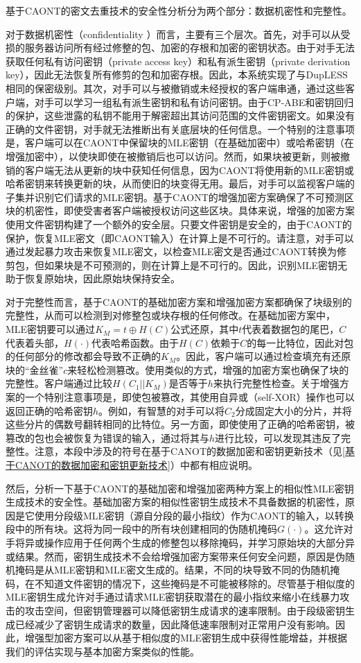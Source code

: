 \documentclass[promaster]{thesis-uestc}
\begin{document}
基于CAONT的密文去重技术的安全性分析分为两个部分：数据机密性和完整性。

对于数据机密性（confidentiality ）而言，主要有三个层次。首先，对手可以从受损的服务器访问所有经过修整的包、加密的存根和加密的密钥状态。由于对手无法获取任何私有访问密钥（private access key）和私有派生密钥（private derivation key），因此无法恢复所有修剪的包和加密存根。因此，本系统实现了与DupLESS相同的保密级别。其次，对手可以与被撤销或未经授权的客户端串通，通过这些客户端，对手可以学习一组私有派生密钥和私有访问密钥。由于CP-ABE和密钥回归的保护，这些泄露的私钥不能用于解密超出其访问范围的文件密钥密文。如果没有正确的文件密钥，对手就无法推断出有关底层块的任何信息。一个特别的注意事项是，客户端可以在CAONT中保留块的MLE密钥（在基础加密中）或哈希密钥（在增强加密中），以使块即使在被撤销后也可以访问。然而，如果块被更新，则被撤销的客户端无法从更新的块中获知任何信息，因为CAONT将使用新的MLE密钥或哈希密钥来转换更新的块，从而使旧的块变得无用。最后，对手可以监视客户端的子集并识别它们请求的MLE密钥。基于CAONT的增强加密方案确保了不可预测区块的机密性，即使受害者客户端被授权访问这些区块。具体来说，增强的加密方案使用文件密钥构建了一个额外的安全层。只要文件密钥是安全的，由于CAONT的保护，恢复MLE密文（即CAONT输入）在计算上是不可行的。请注意，对手可以通过发起暴力攻击来恢复MLE密文，以检查MLE密文是否通过CAONT转换为修剪包，但如果块是不可预测的，则在计算上是不可行的。因此，识别MLE密钥无助于恢复原始块，因此原始块保持安全。

对于完整性而言，基于CAONT的基础加密方案和增强加密方案都确保了块级别的完整性，从而可以检测到对修整包或块存根的任何修改。在基础加密方案中，MLE密钥要可以通过$K_M = t \oplus H(C)$公式还原，其中$t$代表着数据包的尾巴，$C$代表着头部，$H(\cdot)$代表哈希函数。由于$H(C)$依赖于$C$的每一比特位，因此对包的任何部分的修改都会导致不正确的$K_M$。因此，客户端可以通过检查填充有还原块的“金丝雀”$c$来轻松检测篡改。使用类似的方式，增强的加密方案也确保了块的完整性。客户端通过比较$H(C_1||K_M)$是否等于$h$来执行完整性检查。关于增强方案的一个特别注意事项是，即使包被篡改，其使用自异或（self-XOR）操作也可以返回正确的哈希密钥$h$。例如，有智慧的对手可以将$C_2$分成固定大小的分片，并将这些分片的偶数号翻转相同的比特位。另一方面，即使使用了正确的哈希密钥，被篡改的包也会被恢复为错误的输入，通过将其与$h$进行比较，可以发现其违反了完整性。注意，本段中涉及的符号在基于CANOT的数据加密和密钥更新技术（见\ref{基于CANOT的数据加密和密钥更新技术}）中都有相应说明。

然后，分析一下基于CAONT的基础加密和增强加密两种方案上的相似性MLE密钥生成技术的安全性。基础加密方案的相似性密钥生成技术不具备数据的机密性，原因是它使用分段级MLE密钥（源自分段的最小指纹）作为CAONT的输入，以转换段中的所有块。这将为同一段中的所有块创建相同的伪随机掩码$G(\cdot)$。这允许对手将异或操作应用于任何两个生成的修整包以移除掩码，并学习原始块的大部分异或结果。然而，密钥生成技术不会给增强加密方案带来任何安全问题，原因是伪随机掩码是从MLE密钥和MLE密文生成的。结果，不同的块导致不同的伪随机掩码，在不知道文件密钥的情况下，这些掩码是不可能被移除的。尽管基于相似度的MLE密钥生成允许对手通过请求MLE密钥获取潜在的最小指纹来缩小在线暴力攻击的攻击空间，但密钥管理器可以降低密钥生成请求的速率限制。由于段级密钥生成已经减少了密钥生成请求的数量，因此降低速率限制对正常用户没有影响。因此，增强型加密方案可以从基于相似度的MLE密钥生成中获得性能增益，并根据我们的评估实现与基本加密方案类似的性能。
\end{document}
